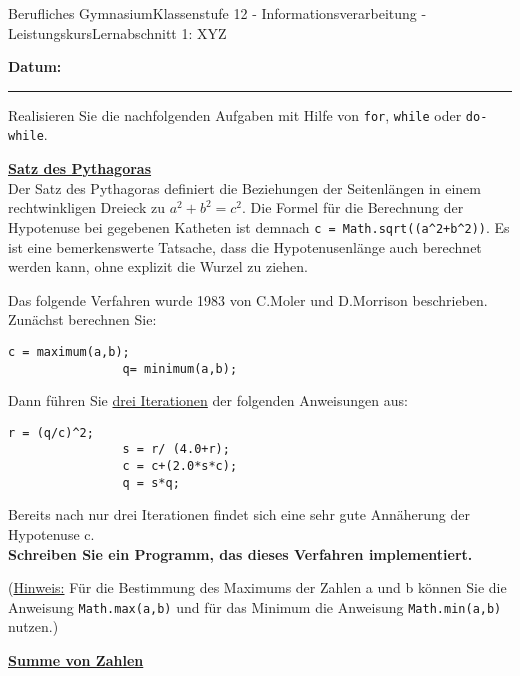 \documentclass[oneside,openany,headings=optiontotoc,11pt,numbers=noenddot]{scrreprt}
\begin{document}
	\begin{worksheet}{Berufliches Gymnasium}{Klassenstufe 12 - Informationsverarbeitung - Leistungskurs}{Lernabschnitt 1: XYZ}
				
		\noindent
		\sffamily
		\textbf{Datum:}
		\rule{0.91\textwidth}{0.4pt}
		\begin{framed}
			\noindent
			Realisieren Sie die nachfolgenden Aufgaben mit Hilfe von \lstinline[style=JavaInputStyle]{for}, \lstinline[style=JavaInputStyle]{while} oder \lstinline[style=JavaInputStyle]{do-while}.\\
			\par\noindent
			\textbf{\underline{Satz des Pythagoras}}\\
			Der Satz des Pythagoras definiert die Beziehungen der Seitenlängen in einem rechtwinkligen Dreieck zu \(a^2 + b^2 = c^2\). Die Formel für die Berechnung der Hypotenuse bei gegebenen Katheten ist demnach \lstinline[style=JavaInputStyle]{c = Math.sqrt((a^2+b^2))}. Es ist eine bemerkenswerte Tatsache, dass die Hypotenusenlänge auch berechnet werden kann, ohne explizit die Wurzel zu ziehen.\\
			\par\noindent
			Das folgende Verfahren wurde 1983 von C.Moler und D.Morrison beschrieben.\\Zunächst berechnen Sie:
			\begin{lstlisting}[style=JavaInputStyle]
				c = maximum(a,b);
				q= minimum(a,b);
			\end{lstlisting}
			Dann führen Sie \underline{drei Iterationen} der folgenden Anweisungen aus:
			\begin{lstlisting}[style=JavaInputStyle]
				r = (q/c)^2;
				s = r/ (4.0+r);
				c = c+(2.0*s*c);
				q = s*q;
			\end{lstlisting}
			\par\noindent
			Bereits nach nur drei Iterationen findet sich eine sehr gute Annäherung der Hypotenuse c.\\
			\textbf{Schreiben Sie ein Programm, das dieses Verfahren implementiert.}\\
			\par\noindent
			(\underline{Hinweis:} Für die Bestimmung des Maximums der Zahlen a und b können Sie die Anweisung \lstinline[style=JavaInputStyle]{Math.max(a,b)} und für das Minimum die Anweisung \lstinline[style=JavaInputStyle]{Math.min(a,b)} nutzen.)\\
			\par\bigskip\noindent
			\textbf{\underline{Summe von Zahlen}}\\

\end{framed}
\end{worksheet}
\end{document}
